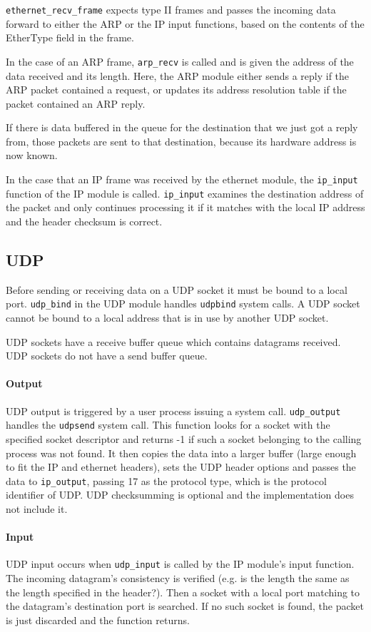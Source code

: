 \documentclass[11pt,twoside,abstract,notitlepage]{scrreprt}
\begin{document}
\texttt{ethernet\_recv\_frame} expects type II frames and passes the incoming data forward to either the ARP or the IP input functions, based on the contents of the EtherType field in the frame. 

In the case of an ARP frame, \texttt{arp\_recv} is called and is given the address of the data received and its length. Here, the ARP module either sends a reply if the ARP packet contained a request, or updates its address resolution table if the packet contained an ARP reply. 

If there is data buffered in the queue for the destination that we just got a reply from, those packets are sent to that destination, because its hardware address is now known. 

In the case that an IP frame was received by the ethernet module, the \texttt{ip\_input} function of the IP module is called. \texttt{ip\_input} examines the destination address of the packet and only continues processing it if it matches with the local IP address and the header checksum is correct. 


\subsection{UDP}
Before sending or receiving data on a UDP socket it must be bound to a local port. \texttt{udp\_bind} in the UDP module handles \texttt{udpbind} system calls. A UDP socket cannot be bound to a local address that is in use by another UDP socket.

UDP sockets have a receive buffer queue which contains datagrams received. UDP sockets do not have a send buffer queue. 

\paragraph{Output} UDP output is triggered by a user process issuing a system call. \texttt{udp\_output} handles the \texttt{udpsend} system call. This function looks for a socket with the specified socket descriptor and returns -1 if such a socket belonging to the calling process was not found. It then copies the data into a larger buffer (large enough to fit the IP and ethernet headers), sets the UDP header options and passes the data to \texttt{ip\_output}, passing 17 as the protocol type, which is the protocol identifier of UDP. UDP checksumming is optional and the implementation does not include it. 

\paragraph{Input} UDP input occurs when \texttt{udp\_input} is called by the IP module's input function. The incoming datagram's consistency is verified (e.g. is the length the same as the length specified in the header?). Then a socket with a local port matching to the datagram's destination port is searched. If no such socket is found, the packet is just discarded and the function returns. 
\end{document}
